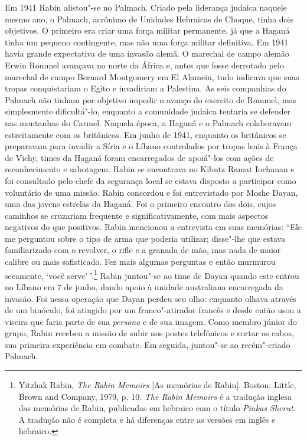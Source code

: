 Em 1941 Rabin alistou"-se no Palmach. Criado pela liderança judaica 
naquele mesmo ano, o Palmach, acrônimo de Unidades Hebraicas de Choque, tinha
dois objetivos. O primeiro era criar uma força militar permanente, já que a
Haganá tinha um pequeno contingente, mas não uma força militar
definitiva. Em 1941 havia grande expectativa de uma invasão alemã. O
marechal de campo alemão Erwin Rommel avançava no norte da África e,
antes que fosse derrotado pelo marechal de campo Bernard Montgomery em
El Alamein, tudo indicava que suas tropas conquistariam o Egito e
invadiriam a Palestina. As seis companhias do Palmach não tinham por
objetivo impedir o avanço do exercito de Rommel, mas simplesmente
dificultá"-lo, enquanto a comunidade judaica tentaria se defender nas
montanhas do Carmel. Naquela época, a Haganá e o Palmach colaboravam
estreitamente com os britânicos. Em junho de 1941, enquanto os
britânicos se preparavam para invadir a Síria e o Líbano controlados por
tropas leais à França de Vichy, times da Haganá foram encarregados de
apoiá"-los com ações de reconhecimento e sabotagem. Rabin se encontrava
no Kibutz Ramat Iochanan e foi consultado pelo chefe da segurança local
se estava disposto a participar como voluntário de uma missão. Rabin
concordou e foi entrevistado por Moshe Dayan, uma das jovens estrelas da
Haganá. Foi o primeiro encontro dos dois, cujos caminhos se cruzariam
frequente e significativamente, com mais aspectos negativos do que
positivos. Rabin mencionou a entrevista em suas memórias: ``Ele me
perguntou sobre o tipo de arma que poderia utilizar; disse"-lhe que
estava familiarizado com o revolver, o rifle e a granada de mão, mas
nada de maior calibre ou mais sofisticado. Fez mais algumas perguntas e
então murmurou secamente, `você serve'\,''.\footnote{Yitzhak Rabin, 
\emph{The Rabin Memoirs} {[}As memórias de Rabin{]}. Boston: Little, Brown and Company, 1979, p. 10.
\emph{The Rabin Memoirs} é a tradução inglesa das memórias de Rabin, publicadas em hebraico com o título
\emph{Pinkas Sherut}. A tradução não é
completa e há diferenças entre as versões em inglês e hebraico.} Rabin juntou"-se ao
time de Dayan quando este entrou no Líbano em 7 de junho, dando apoio à
unidade australiana encarregada da invasão. Foi nessa operação que Dayan
perdeu seu olho: enquanto olhava através de um binóculo, foi atingido
por um franco"-atirador francês e desde então usou a viseira que faria
parte de sua \emph{persona} e de sua imagem. Como membro júnior do grupo,
Rabin recebeu a missão de subir nos postes telefônicos e cortar os
cabos, sua primeira experiência em combate. Em seguida, juntou"-se ao
recém"-criado Palmach.

